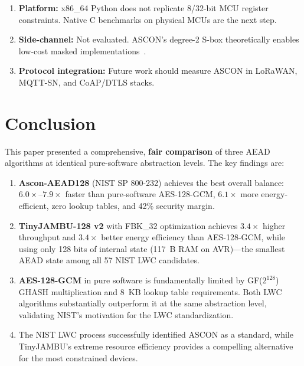 \documentclass[11pt,a4paper]{article}
\begin{document}
\begin{enumerate}
    \item \textbf{Platform:} x86\_64 Python does not replicate 8/32-bit MCU register constraints. Native C benchmarks on physical MCUs are the next step.
    \item \textbf{Side-channel:} Not evaluated. ASCON's degree-2 S-box theoretically enables low-cost masked implementations~\cite{nistir8454}.
    \item \textbf{Protocol integration:} Future work should measure ASCON in LoRaWAN, MQTT-SN, and CoAP/DTLS stacks.
\end{enumerate}

\section{Conclusion}

This paper presented a comprehensive, \textbf{fair comparison} of three AEAD algorithms at identical pure-software abstraction levels. The key findings are:

\begin{enumerate}
    \item \textbf{Ascon-AEAD128} (NIST SP 800-232) achieves the best overall balance: $6.0\times$--$7.9\times$ faster than pure-software AES-128-GCM, $6.1\times$ more energy-efficient, zero lookup tables, and 42\% security margin.
    \item \textbf{TinyJAMBU-128 v2} with FBK\_32 optimization achieves $3.4\times$ higher throughput and $3.4\times$ better energy efficiency than AES-128-GCM, while using only 128 bits of internal state (117~B RAM on AVR)---the smallest AEAD state among all 57 NIST LWC candidates.
    \item \textbf{AES-128-GCM} in pure software is fundamentally limited by GF($2^{128}$) GHASH multiplication and 8~KB lookup table requirements. Both LWC algorithms substantially outperform it at the same abstraction level, validating NIST's motivation for the LWC standardization.
    \item The NIST LWC process successfully identified ASCON as a standard, while TinyJAMBU's extreme resource efficiency provides a compelling alternative for the most constrained devices.
\end{enumerate}
\end{document}
